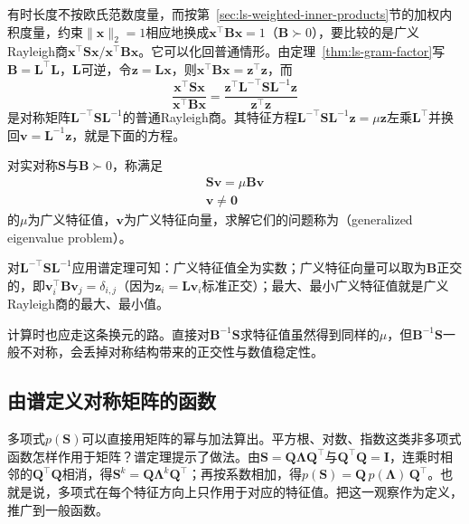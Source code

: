 有时长度不按欧氏范数度量，而按第~\ref{sec:ls-weighted-inner-products}节的加权内积度量，约束$\lVert\bm x\rVert_2=1$相应地换成$\bm x^\top\bm B\bm x=1$（$\bm B\succ0$），要比较的是广义Rayleigh商$\bm x^\top\bm S\bm x/\bm x^\top\bm B\bm x$。它可以化回普通情形。由定理~\ref{thm:ls-gram-factor}写$\bm B=\bm L^\top\bm L$，$\bm L$可逆，令$\bm z=\bm L\bm x$，则$\bm x^\top\bm B\bm x=\bm z^\top\bm z$，而
\[
 \frac{\bm x^\top\bm S\bm x}{\bm x^\top\bm B\bm x}
 =\frac{\bm z^\top\bm L^{-\top}\bm S\bm L^{-1}\bm z}{\bm z^\top\bm z}
\]
是对称矩阵$\bm L^{-\top}\bm S\bm L^{-1}$的普通Rayleigh商。其特征方程$\bm L^{-\top}\bm S\bm L^{-1}\bm z=\mu\bm z$左乘$\bm L^\top$并换回$\bm v=\bm L^{-1}\bm z$，就是下面的方程。
\begin{definition}[广义特征值]
\label{def:matrix-analysis-generalized-eigenvalue}
对实对称$\bm S$与$\bm B\succ0$，称满足
\begin{equation}
\begin{gathered}
\bm S\bm v=\mu\bm B\bm v\\
\bm v\neq\bm0
\end{gathered}
\label{eq:matrix-analysis-generalized-eigenproblem}
\end{equation}
的$\mu$为广义特征值，$\bm v$为广义特征向量，求解它们的问题称为（generalized eigenvalue problem）。
\end{definition}
对$\bm L^{-\top}\bm S\bm L^{-1}$应用谱定理可知：广义特征值全为实数；广义特征向量可以取为$\bm B$正交的，即$\bm v_i^\top\bm B\bm v_j=\delta_{i,j}$（因为$\bm z_i=\bm L\bm v_i$标准正交）；最大、最小广义特征值就是广义Rayleigh商的最大、最小值。

计算时也应走这条换元的路。直接对$\bm B^{-1}\bm S$求特征值虽然得到同样的$\mu$，但$\bm B^{-1}\bm S$一般不对称，会丢掉对称结构带来的正交性与数值稳定性。

\subsection{由谱定义对称矩阵的函数}
\label{sec:ls-matrix-functions}
\label{sec:matrix-analysis-functions-structured-operations}

多项式$p(\bm S)$可以直接用矩阵的幂与加法算出。平方根、对数、指数这类非多项式函数怎样作用于矩阵？谱定理提示了做法。由$\bm S=\bm Q\bm\Lambda\bm Q^\top$与$\bm Q^\top\bm Q=\bm I$，连乘时相邻的$\bm Q^\top\bm Q$相消，得$\bm S^k=\bm Q\bm\Lambda^k\bm Q^\top$；再按系数相加，得$p(\bm S)=\bm Q\,p(\bm\Lambda)\,\bm Q^\top$。也就是说，多项式在每个特征方向上只作用于对应的特征值。把这一观察作为定义，推广到一般函数。

